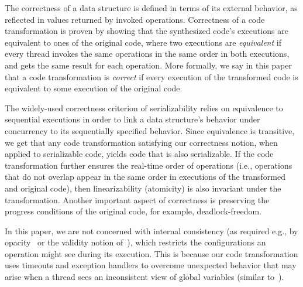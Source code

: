 The correctness of a data structure is defined in terms of its external behavior, as reflected in values returned by invoked operations.
Correctness of a code transformation is proven by showing that the synthesized code's executions are equivalent to ones of the original code,
where two executions are  \emph{equivalent} if every thread invokes the same
operations in the same order  in both executions, and gets the same result for each operation. More formally, we say in this paper that a code transformation is \emph{correct} if every execution of the transformed code
is equivalent to some execution of the original code.

The widely-used correctness criterion of serializability relies on equivalence to sequential executions in order to
link a data structure's behavior under concurrency to its sequentially specified behavior. Since equivalence is transitive,
we get that any code transformation satisfying our correctness notion, when applied to serializable code, yields code that is also serializable.
If the code transformation further ensures the real-time order of operations (i.e., operations that do not overlap appear in the same order in 
executions of the transformed and original code), then linearizability (atomicity) is also invariant under the transformation.
Another important aspect of correctness is preserving the progress conditions of the original code, for example, deadlock-freedom.

In this paper, we are not concerned with internal consistency (as required e.g., by opacity~\cite{GuerraouiK2008} or the validity notion of~\cite{LevAriCK2014}),
which restricts the configurations an operation might see during its execution.
This is because our code transformation uses timeouts and exception handlers to overcome unexpected behavior that may arise when a thread sees an inconsistent view of global variables (similar to~\cite{Nakaike:2010}).


